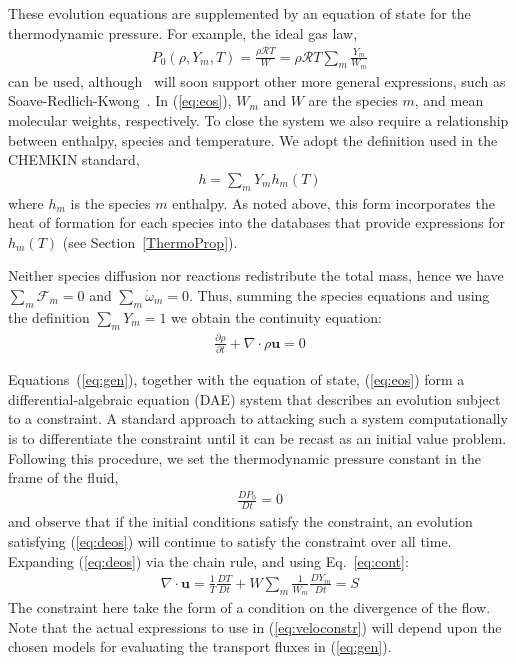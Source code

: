 These evolution equations are supplemented by an equation of state for the thermodynamic pressure.  For example, the ideal gas law,
\begin{eqnarray}
P_0(\rho,Y_m,T)=\frac{\rho \mathcal{R} T}{W}=\rho \mathcal{R} T \sum_m \frac{Y_m}{W_m}
\label{eq:eos}
\end{eqnarray}
can be used, although \pelelm\ will soon support other more general expressions, such as
Soave-Redlich-Kwong~\cite{Soave1972}.  In (\ref{eq:eos}), $W_m$ and $W$ are the species $m$, and mean
molecular weights, respectively.  To close the system
we also require a relationship between enthalpy, species and temperature.  We adopt the definition used in the CHEMKIN standard, 
\begin{eqnarray}
  h=\sum_m Y_m h_m(T)
  \label{eq:hofT}
\end{eqnarray}
where $h_m$ is the species $m$ enthalpy.  As noted above, this form incorporates the heat of formation for each species into the databases that provide expressions for $h_m(T)$ (see Section~\ref{ThermoProp}).

Neither species diffusion nor reactions redistribute the total mass, hence we have $\sum_m \boldsymbol{\mathcal{F}}_m = 0$ and $\sum_m \dot{\omega}_m = 0$. Thus, summing the species equations and using the definition $\sum_m Y_m = 1$ we obtain the continuity equation:
\begin{eqnarray}
\frac{\partial \rho}{\partial t} + \nabla \cdot \rho \boldsymbol{u} = 0
\label{eq:cont}
\end{eqnarray}

Equations~(\ref{eq:gen}), together with the equation of state, (\ref{eq:eos}) form a differential-algebraic equation (DAE) system that describes an evolution subject to a constraint.  A standard approach to attacking such a system computationally is to differentiate the constraint until it can be recast as an initial value problem.  Following this procedure, we set the thermodynamic pressure constant in the frame of the fluid,
\begin{eqnarray}
\frac{DP_0}{Dt} = 0
\label{eq:deos}
\end{eqnarray}
and observe that if the initial conditions satisfy the constraint, an evolution satisfying (\ref{eq:deos}) 
will continue to satisfy the constraint over all time.  Expanding (\ref{eq:deos}) via the chain rule, and using
Eq.~\ref{eq:cont}:
\begin{eqnarray}
\nabla \cdot \boldsymbol{u} = \frac{1}{T}\frac{DT}{Dt} + W \sum_m \frac{1}{W_m} \frac{DY_m}{Dt} = S
\label{eq:veloconstr}
\end{eqnarray}
The constraint here take the form of a condition on the divergence of the flow.  Note that the actual expressions to use in (\ref{eq:veloconstr}) will depend upon the chosen models for evaluating the transport fluxes in (\ref{eq:gen}).


